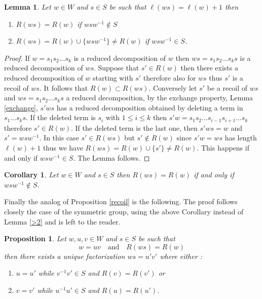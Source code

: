 \documentclass[11pt,a4paper]{amsart}
\newtheorem{lemma}[theorem]{Lemma}
\newtheorem{proposition}[theorem]{Proposition}
\newtheorem{cor}[theorem]{Corollary}
\theoremstyle{contraction}
\begin{document}
\begin{lemma} \label{Coxrecoilclass}
Let $w\in W$ and $s\in S$ be such that $\ell(ws)=\ell(w)+1$ then 
\begin{enumerate}
\item
$R(ws)=R(w)$  if  $wsw^{-1}\notin S$ 
\item
 $R(ws)=R(w)\cup\{wsw^{-1}\}\ne R(w)$  if $wsw^{-1}\in S$.
 \end{enumerate}
\end{lemma}
\begin{proof}
 If $w=s_1s_2\ldots s_k$ is a reduced decomposition of $w$ then 
$ws=s_1s_2\ldots s_ks$ is a reduced decomposition of $ws$. 
Suppose that $s'\in R(w)$ then there exists a reduced decomposition of $w$ starting with $s'$ therefore also for $ws$ thus $s'$ is a recoil of $ws$. It follows  that  $R(w)\subset R(ws)$.
Conversely let  $s'$ be a recoil of $ws$ and $ws=s_1s_2\ldots s_ks$ a reduced decomposition, 
by the exchange property, Lemma \ref{exchange},  $s'ws$ has a reduced decomposition obtained by deleting a term in $s_1\ldots s_ks$. If the deleted term is $s_i$ with $1\leq i\leq k$ then $s'w=s_1s_2\ldots s_{i-1}s_{i+1}\ldots s_k$ therefore $s'\in R(w)$.
If the deleted term is the last one,  then $s'ws=w$ and $s'=wsw^{-1}$. In this case $s'\in R(ws)$ but $s'\notin R(w)$ since $s'w=ws$ has length $\ell(w)+1$ thus we have $R(ws)=R(w)\cup\{s'\}\ne R(w)$. This happens if and only if $wsw^{-1}\in S$. 
 The Lemma follows.

\end{proof}
\begin{cor} \label{Cor}
Let $w\in W$ and $s\in S$ then   $R(ws)=R(w)$  if and only if $wsw^{-1}\notin S$.
\end{cor}

Finally the analog of Proposition \ref{recoil} is the following. The proof follows closely the case of the symmetric group, using the above Corollary instead of Lemma \ref{>2} and is left to the reader.


\begin{proposition}\label{Coxrecoil}
Let $w,u,v\in W$  and $s\in S$ be such that $$w=uv\quad \text{and}\quad R(ws)=R(w)$$
 then there exists a unique factorization 
$ws=u'v'$ where either : 
\begin{enumerate}
\item
$u=u'$ while  $v^{-1}v'\in S$ and $R(v)=R(v')$ or
\item
$v=v'$ while $u^{-1}u'\in S$ and $R(u)=R(u')$. 
\end{enumerate}
\end{proposition}
\end{document}
